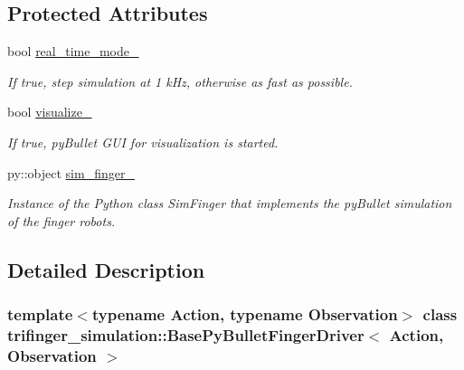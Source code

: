\subsection*{Protected Attributes}
\begin{DoxyCompactItemize}
\item 
\mbox{\label{classtrifinger__simulation_1_1BasePyBulletFingerDriver_aa7f77e383b6f5cd7ea49c31d2dd10092}} 
bool \hyperlink{classtrifinger__simulation_1_1BasePyBulletFingerDriver_aa7f77e383b6f5cd7ea49c31d2dd10092}{real\+\_\+time\+\_\+mode\+\_\+}
\begin{DoxyCompactList}\small\item\em If true, step simulation at 1 k\+Hz, otherwise as fast as possible. \end{DoxyCompactList}\item 
\mbox{\label{classtrifinger__simulation_1_1BasePyBulletFingerDriver_a337afe3f5bf8d1d7a16b4634004f92d4}} 
bool \hyperlink{classtrifinger__simulation_1_1BasePyBulletFingerDriver_a337afe3f5bf8d1d7a16b4634004f92d4}{visualize\+\_\+}
\begin{DoxyCompactList}\small\item\em If true, py\+Bullet G\+UI for visualization is started. \end{DoxyCompactList}\item 
py\+::object \hyperlink{classtrifinger__simulation_1_1BasePyBulletFingerDriver_a9f997da6855f64ca5c483093cfb66b06}{sim\+\_\+finger\+\_\+}
\begin{DoxyCompactList}\small\item\em Instance of the Python class Sim\+Finger that implements the py\+Bullet simulation of the finger robots. \end{DoxyCompactList}\end{DoxyCompactItemize}


\subsection{Detailed Description}
\subsubsection*{template$<$typename Action, typename Observation$>$\newline
class trifinger\+\_\+simulation\+::\+Base\+Py\+Bullet\+Finger\+Driver$<$ Action, Observation $>$}

